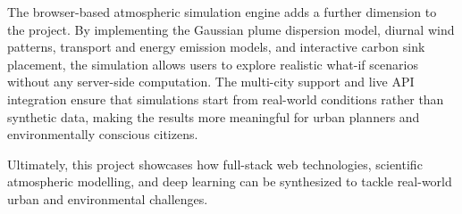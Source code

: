 \documentclass[a4paper, 12pt]{report}
\begin{document}
The browser-based atmospheric simulation engine adds a further dimension to the project. By implementing the Gaussian plume dispersion model, diurnal wind patterns, transport and energy emission models, and interactive carbon sink placement, the simulation allows users to explore realistic what-if scenarios without any server-side computation. The multi-city support and live API integration ensure that simulations start from real-world conditions rather than synthetic data, making the results more meaningful for urban planners and environmentally conscious citizens.

Ultimately, this project showcases how full-stack web technologies, scientific atmospheric modelling, and deep learning can be synthesized to tackle real-world urban and environmental challenges.
\end{document}

